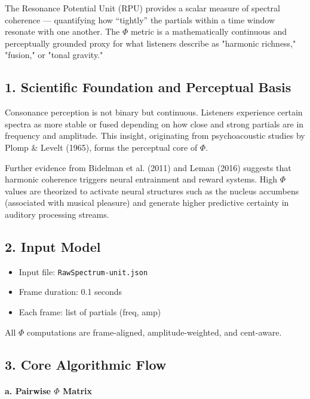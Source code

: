 \documentclass{article}
\begin{document}
The Resonance Potential Unit (RPU) provides a scalar measure of spectral coherence — quantifying how “tightly” the partials within a time window resonate with one another. The $\Phi$ metric is a mathematically continuous and perceptually grounded proxy for what listeners describe as "harmonic richness," "fusion," or "tonal gravity."

\subsection*{1. Scientific Foundation and Perceptual Basis}

Consonance perception is not binary but continuous. Listeners experience certain spectra as more stable or fused depending on how close and strong partials are in frequency and amplitude. This insight, originating from psychoacoustic studies by Plomp \& Levelt (1965), forms the perceptual core of $\Phi$.

Further evidence from Bidelman et al. (2011) and Leman (2016) suggests that harmonic coherence triggers neural entrainment and reward systems. High $\Phi$ values are theorized to activate neural structures such as the nucleus accumbens (associated with musical pleasure) and generate higher predictive certainty in auditory processing streams.

\subsection*{2. Input Model}

\begin{itemize}
    \item Input file: \texttt{RawSpectrum-unit.json}
    \item Frame duration: 0.1 seconds
    \item Each frame: list of partials (freq, amp)
\end{itemize}

All $\Phi$ computations are frame-aligned, amplitude-weighted, and cent-aware.

\subsection*{3. Core Algorithmic Flow}

\paragraph{a. Pairwise $\Phi$ Matrix}
\end{document}
